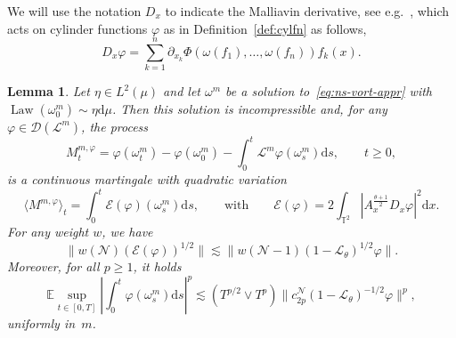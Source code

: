 \documentclass[10pt]{article}
\newcommand{\mathd}{\mathrm{d}}
\newcommand{\tmop}[1]{\ensuremath{\operatorname{#1}}}
\newtheorem{lemma}{Lemma}
\begin{document}
We will use the notation $D_x$ to indicate the Malliavin derivative, see
e.g.~{\cite{gubinelli2018infinitesimal}}, which acts on cylinder functions
$\varphi$ as in Definition~\ref{def:cylfn} as follows,
\[ D_x \varphi = \sum_{k = 1}^n \partial_{x_k} \Phi (\omega (f_1), \ldots,
   \omega (f_n)) f_k (x) . \]
\begin{lemma}
  \label{lemma:galerkin-estimates}Let $\eta \in L^2 (\mu)$ and let $\omega^m$
  be a solution to~{\eqref{eq:ns-vort-appr}} with $\tmop{Law} (\omega^m_0)
  \sim \eta \mathd \mu$. Then this solution is incompressible and, for any
  $\varphi \in \mathcal{D} (\mathcal{L}^m)$, the process
  \[ M_t^{m, \varphi} = \varphi (\omega^m_t) - \varphi (\omega^m_0) - \int_0^t
     \mathcal{L}^m \varphi (\omega_s^m) \mathd s, \qquad t \geqslant 0,
     \label{eq:mart-prob-m} \]
  is a continuous martingale with quadratic variation
  \begin{equation}
    \langle M^{m, \varphi} \rangle_t = \int_0^t \mathcal{E} (\varphi)
    (\omega^m_s) \mathd s, \qquad \text{with} \qquad \mathcal{E} (\varphi) = 2
    \int_{\mathbb{T}^2} |A^{\frac{\theta + 1}{2}}_x D_x \varphi |^2 \mathd x.
    \label{eq:mart-qvar}
  \end{equation}
  For any weight $w$, we have
  \begin{equation}
    \| w (\mathcal{N}) (\mathcal{E} (\varphi))^{1 / 2} \| \lesssim \| w
    (\mathcal{N}- 1) (1 -\mathcal{L}_{\theta})^{1 / 2} \varphi \| .
    \label{eq:energy-norm}
  \end{equation}
  Moreover, for all $p \geqslant 1$, it holds
  \begin{equation}
    \mathbb{E} \sup_{t \in [0, T]} \left| \int_0^t \varphi (\omega_s^m) \mathd
    s \right|^p \lesssim (T^{p / 2} \vee T^p) \| c_{2 p}^{\mathcal{N}} (1
    -\mathcal{L}_{\theta})^{- 1 / 2} \varphi \|^p, \label{eq:ito-trick-m}
  \end{equation}
  uniformly in~$m$.
\end{lemma}
\end{document}
